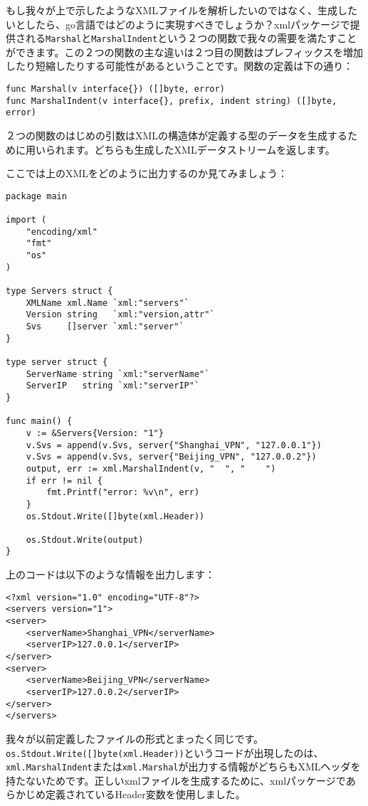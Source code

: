 もし我々が上で示したようなXMLファイルを解析したいのではなく、生成したいとしたら、go言語ではどのように実現すべきでしょうか？xmlパッケージで提供される\texttt{Marshal}と\texttt{MarshalIndent}という２つの関数で我々の需要を満たすことができます。この２つの関数の主な違いは２つ目の関数はプレフィックスを増加したり短縮したりする可能性があるということです。関数の定義は下の通り：

\begin{lstlisting}[numbers=none]
func Marshal(v interface{}) ([]byte, error)
func MarshalIndent(v interface{}, prefix, indent string) ([]byte, error)
\end{lstlisting}

２つの関数のはじめの引数はXMLの構造体が定義する型のデータを生成するために用いられます。どちらも生成したXMLデータストリームを返します。

ここでは上のXMLをどのように出力するのか見てみましょう：

\begin{lstlisting}[numbers=none]
package main

import (
    "encoding/xml"
    "fmt"
    "os"
)

type Servers struct {
    XMLName xml.Name `xml:"servers"`
    Version string   `xml:"version,attr"`
    Svs     []server `xml:"server"`
}

type server struct {
    ServerName string `xml:"serverName"`
    ServerIP   string `xml:"serverIP"`
}

func main() {
    v := &Servers{Version: "1"}
    v.Svs = append(v.Svs, server{"Shanghai_VPN", "127.0.0.1"})
    v.Svs = append(v.Svs, server{"Beijing_VPN", "127.0.0.2"})
    output, err := xml.MarshalIndent(v, "  ", "    ")
    if err != nil {
        fmt.Printf("error: %v\n", err)
    }
    os.Stdout.Write([]byte(xml.Header))

    os.Stdout.Write(output)
}
\end{lstlisting}

上のコードは以下のような情報を出力します：

\begin{lstlisting}[numbers=none]
<?xml version="1.0" encoding="UTF-8"?>
<servers version="1">
<server>
    <serverName>Shanghai_VPN</serverName>
    <serverIP>127.0.0.1</serverIP>
</server>
<server>
    <serverName>Beijing_VPN</serverName>
    <serverIP>127.0.0.2</serverIP>
</server>
</servers>
\end{lstlisting}

我々が以前定義したファイルの形式とまったく同じです。\texttt{os.Stdout.Write([]byte(xml.Header))}というコードが出現したのは、\texttt{xml.MarshalIndent}または\texttt{xml.Marshal}が出力する情報がどちらもXMLヘッダを持たないためです。正しいxmlファイルを生成するために、xmlパッケージであらかじめ定義されているHeader変数を使用しました。

